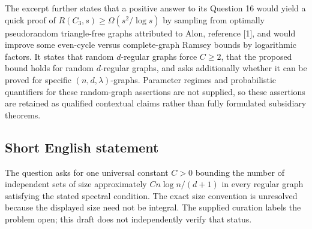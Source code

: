\documentclass[11pt]{article}
\begin{document}
The excerpt further states that a positive answer to its Question 16 would yield a quick proof of \(R(C_3,s)\geq\Omega(s^2/\log s)\) by sampling from optimally pseudorandom triangle-free graphs attributed to Alon, reference [1], and would improve some even-cycle versus complete-graph Ramsey bounds by logarithmic factors. It states that random \(d\)-regular graphs force \(C\geq2\), that the proposed bound holds for random \(d\)-regular graphs, and asks additionally whether it can be proved for specific \((n,d,\lambda)\)-graphs. Parameter regimes and probabilistic quantifiers for these random-graph assertions are not supplied, so these assertions are retained as qualified contextual claims rather than fully formulated subsidiary theorems.
\subsection{Short English statement}
The question asks for one universal constant \(C>0\) bounding the number of independent sets of size approximately \(Cn\log n/(d+1)\) in every regular graph satisfying the stated spectral condition. The exact size convention is unresolved because the displayed size need not be integral. The supplied curation labels the problem open; this draft does not independently verify that status.
\end{document}
